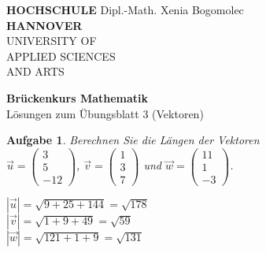 \documentclass[12pt]{article}
\newtheorem{exercise}[satz]{Aufgabe}
\begin{document}
\pagestyle{empty}
\parindent 0cm
\begin{minipage}{14cm}
  \footnotesize{\textbf{HOCHSCHULE} \hfill Dipl.-Math. Xenia Bogomolec\\
  \textbf{HANNOVER}\\
  UNIVERSITY OF\\
  APPLIED SCIENCES\\
  AND ARTS
  }
\end{minipage}
\vspace{1.0cm}

\begin{center}
  {\Large \bf Br\"uckenkurs Mathematik} \\
  \vspace{0.5cm}
  {\large L\"osungen zum \"Ubungsblatt 3 (Vektoren)}  \\
\end{center}
\vspace{0.5cm}
\normalsize
\parindent0cm

\begin{exercise}
  Berechnen Sie die L\"angen der Vektoren \\
  $\vec{u}=\left(\begin{array}{r} 3 \\ 5 \\ -12 \end{array}\right)$,
  $\vec{v}=\left(\begin{array}{r} 1 \\ 3 \\ 7 \end{array}\right)$ und
  $\vec{w}=\left(\begin{array}{r} 11 \\ 1 \\ -3 \end{array}\right)$. \\ 

  \vspace{0.1cm}

  $|\vec{u}| = \sqrt{9+25+144} = \sqrt{178}$\\
  $|\vec{v}| = \sqrt{1+9+49} = \sqrt{59}$\\
  $|\vec{w}| = \sqrt{121+1+9} = \sqrt{131}$ 

\end{exercise}

\vspace{0.1cm}
\end{document}
